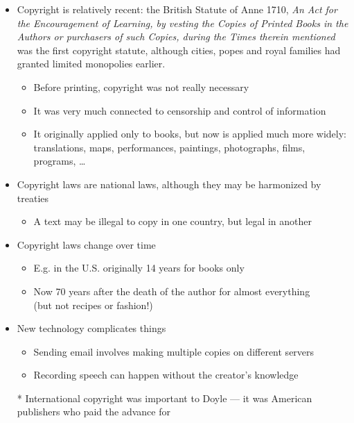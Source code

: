 \documentclass[a4paper,landscape,headrule,footrule,xetex]{foils}
\begin{document}
\begin{itemize}
\newpage
\item Copyright is relatively recent: the British Statute of Anne
  1710, \textit{An Act for the Encouragement of Learning, by
  vesting the Copies of Printed Books in the Authors or purchasers of
  such Copies, during the Times therein mentioned} was the first
  copyright statute, although cities, popes and royal families had
  granted limited monopolies earlier.
  \begin{itemize}
  \item Before printing, copyright was not really necessary
  \item It was very much connected to censorship and control of information
  \item It originally applied only to books, but now is applied much
    more widely: translations, maps, performances, paintings,
    photographs, films, programs, \ldots
  \end{itemize}
\item Copyright laws are national laws, although they may be
  harmonized by treaties
  \begin{itemize}
  \item A text may be illegal to copy in one country, but legal in another
  \end{itemize}
\newpage
\item Copyright laws change over time
  \begin{itemize}
  \item E.g. in the U.S. originally 14 years for books only
  \item Now 70 years after the death of the author for almost
    everything \\ (but not recipes or fashion!)
  \end{itemize}
\item New technology complicates things
  \begin{itemize}
  \item Sending email involves making multiple copies on different servers
  \item Recording speech can happen without the creator's knowledge
  \end{itemize}
\item[*] International copyright was important to Doyle --- it was
  American publishers who paid the advance for 

\end{itemize}


\end{document}
